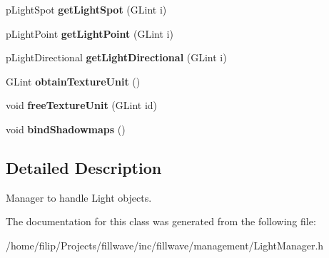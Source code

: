 \begin{DoxyCompactItemize}
\item 
\hypertarget{classfillwave_1_1manager_1_1LightManager_a10eecb05b4cb11f0698abbe8e4c606d2}{}p\+Light\+Spot {\bfseries get\+Light\+Spot} (G\+Lint i)\label{classfillwave_1_1manager_1_1LightManager_a10eecb05b4cb11f0698abbe8e4c606d2}

\item 
\hypertarget{classfillwave_1_1manager_1_1LightManager_a6ce352a65f9dd327e026b875786e3789}{}p\+Light\+Point {\bfseries get\+Light\+Point} (G\+Lint i)\label{classfillwave_1_1manager_1_1LightManager_a6ce352a65f9dd327e026b875786e3789}

\item 
\hypertarget{classfillwave_1_1manager_1_1LightManager_a4c76231b20a196bc20f0ed6fe4625a85}{}p\+Light\+Directional {\bfseries get\+Light\+Directional} (G\+Lint i)\label{classfillwave_1_1manager_1_1LightManager_a4c76231b20a196bc20f0ed6fe4625a85}

\item 
\hypertarget{classfillwave_1_1manager_1_1LightManager_a49d6b5f3a34e867a3452960b43ecac1e}{}G\+Lint {\bfseries obtain\+Texture\+Unit} ()\label{classfillwave_1_1manager_1_1LightManager_a49d6b5f3a34e867a3452960b43ecac1e}

\item 
\hypertarget{classfillwave_1_1manager_1_1LightManager_a91946491b51f766a7cd4da73f06eccd3}{}void {\bfseries free\+Texture\+Unit} (G\+Lint id)\label{classfillwave_1_1manager_1_1LightManager_a91946491b51f766a7cd4da73f06eccd3}

\item 
\hypertarget{classfillwave_1_1manager_1_1LightManager_a77fd3a3574765c47fda19c8c4b92f14a}{}void {\bfseries bind\+Shadowmaps} ()\label{classfillwave_1_1manager_1_1LightManager_a77fd3a3574765c47fda19c8c4b92f14a}

\end{DoxyCompactItemize}


\subsection{Detailed Description}
Manager to handle Light objects. 

The documentation for this class was generated from the following file\+:\begin{DoxyCompactItemize}
\item 
/home/filip/\+Projects/fillwave/inc/fillwave/management/Light\+Manager.\+h\end{DoxyCompactItemize}
